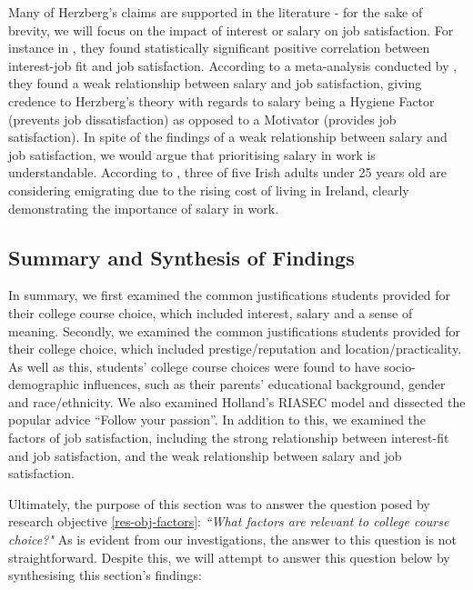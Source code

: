 Many of Herzberg's claims are supported in the literature - for the sake of brevity,
we will focus on the impact of interest or salary on job satisfaction.
For instance in \cite{hoff2018meta, nye2012vocational},
they found statistically significant positive correlation between interest-job fit and job satisfaction.
According to a meta-analysis conducted by \cite{judge2010relationship}, 
they found a weak relationship between salary and job satisfaction, 
giving credence to Herzberg's theory with regards to salary being a Hygiene Factor (prevents job dissatisfaction) 
as opposed to a Motivator (provides job satisfaction).
In spite of the findings of a weak relationship between salary and job satisfaction, 
we would argue that prioritising salary in work is understandable.
According to \cite{nyci2025cost}, three of five Irish adults under 25 years old are considering emigrating due to the rising cost of living in Ireland,
clearly demonstrating the importance of salary in work.

\subsection{Summary and Synthesis of Findings}
\label{sec:factors-summary}

In summary, we first examined the common justifications students provided for their college course choice,
which included interest, salary and a sense of meaning.
Secondly, we examined the common justifications students provided for their college choice,
which included prestige/reputation and location/practicality.
As well as this, students' college course choices were found to have socio-demographic influences, 
such as their parents' educational background, gender and race/ethnicity.
We also examined Holland's RIASEC model and dissected the popular advice ``Follow your passion''.
In addition to this, we examined the factors of job satisfaction, including
the strong relationship between interest-fit and job satisfaction,
and the weak relationship between salary and job satisfaction.

Ultimately, the purpose of this section was to answer the question posed by research objective \ref{res-obj-factors}:
\emph{``What factors are relevant to college course choice?"}
As is evident from our investigations, the answer to this question is not straightforward.
Despite this, we will attempt to answer this question below by synthesising this section's findings:

